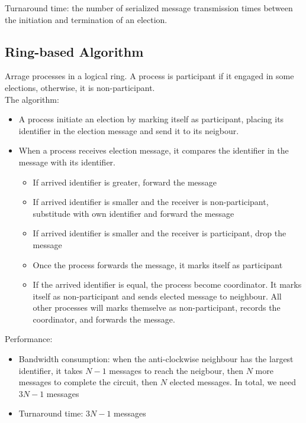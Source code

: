 \begin{multicols*}{2}
\noindent Turnaround time: the number of serialized message transmission times between the initiation and termination of an election. 

\subsection{Ring-based Algorithm}

\noindent Arrage processes in a logical ring. A process is participant if it engaged in some elections, otherwise, it is non-participant.\\

\noindent The algorithm:
\begin{itemize}
  \item A process initiate an election by marking itself as participant, placing its identifier in the election message and send it to its neigbour.
  \item When a process receives election message, it compares the identifier in the message with its identifier.
  \begin{itemize}
    \item If arrived identifier is greater, forward the message
    \item If arrived identifier is smaller and the receiver is non-participant, substitude with own identifier and forward the message
    \item If arrived identifier is smaller and the receiver is participant, drop the message
    \item Once the process forwards the message, it marks itself as participant
    \item If the arrived identifier is equal, the process become coordinator. It marks itself as non-participant and sends elected message to neighbour. All other processes will marks themselve as non-participant, records the coordinator, and forwards the message.
  \end{itemize}
\end{itemize}

\noindent Performance:
\begin{itemize}
  \item Bandwidth consumption: when the anti-clockwise neighbour has the largest identifier, it takes $N-1$ messages to reach the neigbour, then $N$ more messages to complete the circuit, then $N$ elected messages. In total, we need $3N-1$ messages
  \item Turnaround time: $3N-1$ messages
\end{itemize}


\end{multicols*}
